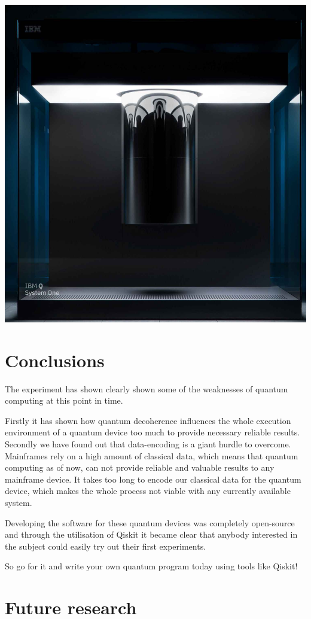 \documentclass[a0,portrait]{a0poster}
\begin{document}
\begin{multicols}{2}
\color{black}


\begin{center}\vspace{1cm}
\includegraphics[width=0.5\linewidth]{QCTest}
\end{center}\vspace{1cm}


\color{HoGentAccent1} 
\section*{Conclusions}
\color{black}
The experiment has shown clearly shown some of the weaknesses of quantum computing at this point in time.

Firstly it has shown how quantum decoherence influences the whole execution environment of a quantum device too much to provide necessary reliable results. Secondly we have found out that data-encoding is a giant hurdle to overcome. Mainframes rely on a high amount of classical data, which means that quantum computing as of now, can not provide reliable and valuable results to any mainframe device. It takes too long to encode our classical data for the quantum device, which makes the whole process not viable with any currently available system.

Developing the software for these quantum devices was completely open-source and through the utilisation of Qiskit it became clear that anybody interested in the subject could easily try out their first experiments. 

So go for it and write your own quantum program today using tools like Qiskit!


\color{HoGentAccent1} 
\section*{Future research}
\color{black}


\end{multicols}
\end{document}
